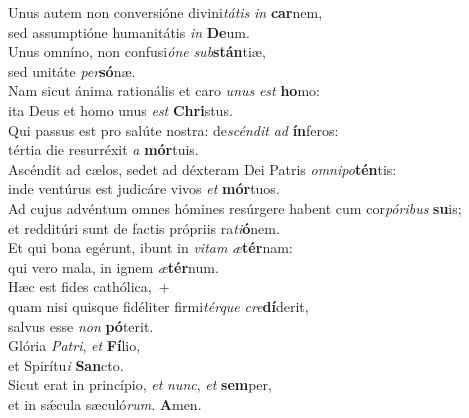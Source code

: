 \oddverse Unus autem non conversióne divini\textit{tá}\textit{tis} \textit{in} \textbf{car}nem,~\*\\
\oddverse sed assumptióne humanitátis \textit{in} \textbf{De}um.\\
\evenverse Unus omníno, non confusi\textit{ó}\textit{ne} \textit{sub}\textbf{stán}tiæ,~\*\\
\evenverse sed unitáte \textit{per}\textbf{só}næ.\\
\oddverse Nam sicut ánima rationális et caro \textit{u}\textit{nus} \textit{est} \textbf{ho}mo:~\*\\
\oddverse ita Deus et homo unus \textit{est} \textbf{Chri}stus.\\
\evenverse Qui passus est pro salúte nostra: de\textit{scén}\textit{dit} \textit{ad} \textbf{ín}feros:~\*\\
\evenverse tértia die resurréxit \textit{a} \textbf{mór}tuis.\\
\oddverse Ascéndit ad cælos, sedet ad déxteram Dei Patris \textit{om}\textit{ni}\textit{po}\textbf{tén}tis:~\*\\
\oddverse inde ventúrus est judicáre vivos \textit{et} \textbf{mór}tuos.\\
\evenverse Ad cujus advéntum omnes hómines resúrgere habent cum cor\textit{pó}\textit{ri}\textit{bus} \textbf{su}is;~\*\\
\evenverse et redditúri sunt de factis própriis ra\textit{ti}\textbf{ó}nem.\\
\oddverse Et qui bona egérunt, ibunt in \textit{vi}\textit{tam} \textit{æ}\textbf{tér}nam:~\*\\
\oddverse qui vero mala, in ignem \textit{æ}\textbf{tér}num.\\
\evenverse Hæc est fides cathólica,~+\\
\evenverse  quam nisi quisque fidéliter firmi\textit{tér}\textit{que} \textit{cre}\textbf{dí}derit,~\*\\
\evenverse salvus esse \textit{non} \textbf{pó}terit.\\
\oddverse Glória \textit{Pa}\textit{tri}, \textit{et} \textbf{Fí}lio,~\*\\
\oddverse et Spirítu\textit{i} \textbf{San}cto.\\
\evenverse Sicut erat in princípio, \textit{et} \textit{nunc}, \textit{et} \textbf{sem}per,~\*\\
\evenverse et in sǽcula sæculó\textit{rum}. \textbf{A}men.\\
